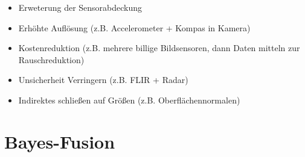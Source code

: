 \documentclass[a4paper]{article}
\begin{document}
\begin{itemize}
\begin{itemize}
             \item Erweterung der Sensorabdeckung
             \item Erhöhte Auflösung (z.B. Accelerometer + Kompas in Kamera)
             \item Kostenreduktion (z.B. mehrere billige Bildsensoren, dann Daten mitteln zur Rauschreduktion)
             \item Unsicherheit Verringern (z.B. FLIR + Radar)
             \item Indirektes schließen auf Größen (z.B. Oberflächennormalen)
         \end{itemize}
    \end{itemize}

    \section{Bayes-Fusion}
\end{document}
